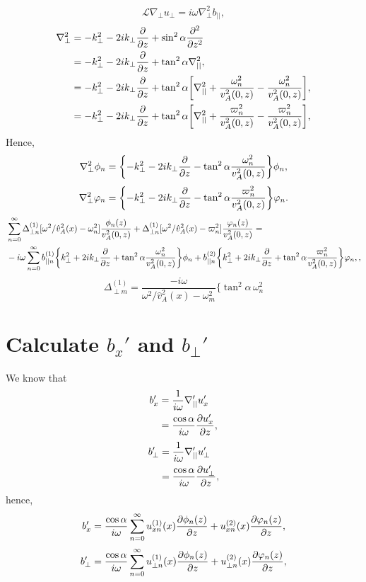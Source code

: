 \documentclass{article}
\begin{document}
\[\mathcal{L}\nabla_\perp u_\perp = i\omega \nabla_\perp^2 b_{||},\]
\[\begin{aligned}
\nabla_\perp^2 &= -k_\perp^2 - 2ik_\perp\pdv{}{z} + \sin^2\alpha\pdv[2]{}{z} \\
&= -k_\perp^2 - 2ik_\perp\pdv{}{z} + \tan^2\alpha\nabla_{||}^2, \\
&= -k_\perp^2 - 2ik_\perp\pdv{}{z} + \tan^2\alpha\qty[\nabla_{||}^2 + \frac{\omega_n^2}{v_A^2(0,z)} - \frac{\omega_n^2}{v_A^2(0,z)}], \\
&= -k_\perp^2 - 2ik_\perp\pdv{}{z} + \tan^2\alpha\qty[\nabla_{||}^2 + \frac{\varpi_n^2}{v_A^2(0,z)} - \frac{\varpi_n^2}{v_A^2(0,z)}],
\end{aligned}\]
Hence,
\[\nabla_\perp^2 \phi_n = \qty{-k_\perp^2 - 2ik_\perp\pdv{}{z} - \tan^2\alpha\frac{\omega_n^2}{v_A^2(0,z)}}\phi_n,\]
\[\nabla_\perp^2 \varphi_n = \qty{-k_\perp^2 - 2ik_\perp\pdv{}{z} - \tan^2\alpha\frac{\varpi_n^2}{v_A^2(0,z)}}\varphi_n.\]
\[\begin{aligned}
&\sum_{n=0}^\infty \Delta_{\perp n}^{(1)}[\omega^2/\hat{v}_A^2(x) - \omega_n^2]\frac{\phi_n(z)}{v_A^2(0,z)}+\Delta_{\perp n}^{(1)}[\omega^2/\hat{v}_A^2(x) - \varpi_n^2]\frac{\varphi_n(z)}{v_A^2(0,z)}=\\
&-i\omega\sum_{n=0}^\infty b_{||n}^{(1)}\qty{k_\perp^2 + 2ik_\perp\pdv{}{z} + \tan^2\alpha\frac{\omega_n^2}{v_A^2(0,z)}}\phi_n + b_{||n}^{(2)}\qty{k_\perp^2 + 2ik_\perp\pdv{}{z} + \tan^2\alpha\frac{\varpi_n^2}{v_A^2(0,z)}}\varphi_n,,
\end{aligned}\]
\[\Delta_{\perp m}^{(1)}=\frac{-i\omega}{\omega^2/\hat{v}_A^2(x)-\omega_m^2}\Bigg\{\tan^2\alpha\,\omega_n^2\]

\section*{Calculate $b_x'$ and $b_\perp'$}

We know that
\[\begin{aligned}
b_x' &= \frac{1}{i\omega}\nabla_{||}'u_x' \\
&= \frac{\cos\alpha}{i\omega}\pdv{u_x'}{z},
\end{aligned}\]
\[\begin{aligned}
b_\perp' &= \frac{1}{i\omega}\nabla_{||}'u_\perp' \\
&= \frac{\cos\alpha}{i\omega}\pdv{u_\perp'}{z},
\end{aligned}\]
hence,
\[b_x' = \frac{\cos\alpha}{i\omega}\sum_{n=0}^\infty u_{xn}^{(1)}(x)\pdv{\phi_n(z)}{z} + u_{xn}^{(2)}(x)\pdv{\varphi_n(z)}{z},\]
\[b_\perp' = \frac{\cos\alpha}{i\omega}\sum_{n=0}^\infty u_{\perp n}^{(1)}(x)\pdv{\phi_n(z)}{z} + u_{\perp n}^{(2)}(x)\pdv{\varphi_n(z)}{z},\]
\end{document}
